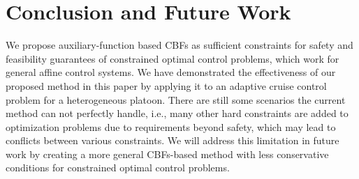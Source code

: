 \documentclass[letterpaper, 10 pt, conference]{ieeeconf}
\theoremstyle{definition}
\begin{document}
\section{Conclusion and Future Work}
\label{sec:Conclusion and Future Work}
We propose auxiliary-function based CBFs as sufficient constraints for safety and feasibility guarantees of constrained optimal control problems, which work for general affine control systems. We have demonstrated the effectiveness of our proposed method in this paper by applying it to an adaptive cruise control problem for a heterogeneous platoon. There are still some scenarios the current method can not perfectly handle, i.e., many other hard constraints are added to optimization problems due to requirements beyond safety, which may lead to conflicts between various constraints. We will address this limitation in future work by creating a more general CBFs-based method with less conservative conditions for constrained optimal control problems.

\balance

\end{document}

